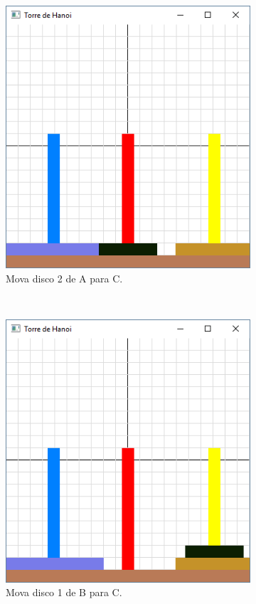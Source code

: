 \begin{figure}[H]
  ~
  \begin{subfigure}[t]{.25\textwidth}
    \includegraphics[scale=0.3]{img/hanoi_4c}
    \caption{Mova disco 2 de A para C.} 
  \end{subfigure}
  ~
  \begin{subfigure}[t]{.25\textwidth}
    \includegraphics[scale=0.3]{img/hanoi_4d}
    \caption{Mova disco 1 de B para C.} 
  \end{subfigure}
  ~
  \begin{subfigure}[t]{.25\textwidth}

\end{subfigure}
\end{figure}
